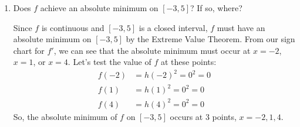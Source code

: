 \documentclass{article}
\begin{document}
\begin{enumerate}
\begin{enumerate}[resume]
    \begin{solution}
      Since $f$ is continuous and $[-3, 5]$ is a closed interval, $f$
      must have an absolute maximum on $[-3, 5]$ by the Extreme Value
      Theorem.  From our sign chart for $f'$, we can see that the
      absolute maximum must occur at $x = -3$, $x = 0$, $x = 3$, or $x =
      5$; to decide which one is correct, we can simply test the value
      of $f$ at all these points:
      \begin{align*}
        f(-3) &= h(-3)^2 = (-4)^2 = 16 \\
        f(0) &= h(0)^2 = 3^2 = 9 \\
        f(3) &= h(3)^2 = (-3)^2 = 9 \\
        f(5) &= h(5)^2 = 2^2 = 4
      \end{align*}
      So, $f$ has its absolute maximum at $\boxed{x = -3}$. 
    \end{solution}

  \item
    \begin{problem}[\vfill]
      Does $f$ achieve an absolute minimum on $[-3, 5]$?  If so, where?
    \end{problem}

    \begin{solution}
      Since $f$ is continuous and $[-3, 5]$ is a closed interval, $f$
      must have an absolute minimum on $[-3, 5]$ by the Extreme Value
      Theorem.  From our sign chart for $f'$, we can see that the
      absolute minimum must occur at $x = -2$, $x = 1$, or $x = 4$.
      Let's test the value of $f$ at these points:
      \begin{align*}
        f(-2) &= h(-2)^2 = 0^2 = 0 \\
        f(1) &= h(1)^2 = 0^2 = 0 \\
        f(4) &= h(4)^2 = 0^2 = 0
      \end{align*}
      So, the absolute minimum of $f$ on $[-3, 5]$ occurs at 3 points,
      $\boxed{x = -2, 1, 4}$. 
    \end{solution}

  \end{enumerate}    

\end{enumerate}
\end{document}
